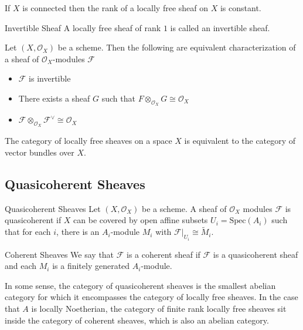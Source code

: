 \documentclass[a4paper]{article}
\begin{document}
\begin{lmm}{}{} If $X$ is connected then the rank of a locally free sheaf on $X$ is constant. 
\end{lmm}

\begin{defn}{Invertible Sheaf}{} A locally free sheaf of rank $1$ is called an invertible sheaf. 
\end{defn}

\begin{thm}{}{} Let $(X,\mathcal{O}_X)$ be a scheme. Then the following are equivalent characterization of a sheaf of $\mathcal{O}_X$-modules $\mathcal{F}$
\begin{itemize}
\item $\mathcal{F}$ is invertible
\item There exists a sheaf $G$ such that $F\otimes_{\mathcal{O}_X}G\cong\mathcal{O}_X$
\item $\mathcal{F}\otimes_{\mathcal{O}_X}\mathcal{F}^{\vee}\cong\mathcal{O}_X$
\end{itemize}
\end{thm}

\begin{thm}{}{} The category of locally free sheaves on a space $X$ is equivalent to the category of vector bundles over $X$. 
\end{thm}

\subsection{Quasicoherent Sheaves}
\begin{defn}{Quasicoherent Sheaves}{} Let $(X,\mathcal{O}_X)$ be a scheme. A sheaf of $\mathcal{O}_X$ modules $\mathcal{F}$ is quasicoherent if $X$ can be covered by open affine subsets $U_i=\text{Spec}(A_i)$ such that for each $i$, there is an $A_i$-module $M_i$ with $\mathcal{F}|_{U_i}\cong\tilde{M}_i$. 
\end{defn}

\begin{defn}{Coherent Sheaves}{} We say that $\mathcal{F}$ is a coherent sheaf if $\mathcal{F}$ is a quasicoherent sheaf and each $M_i$ is a finitely generated $A_i$-module. 
\end{defn}

In some sense, the category of quasicoherent sheaves is the smallest abelian category for which it encompasses the category of locally free sheaves. In the case that $A$ is locally Noetherian, the category of finite rank locally free sheaves sit inside the category of coherent sheaves, which is also an abelian category. 
\end{document}
